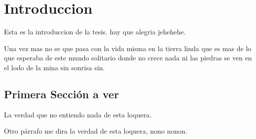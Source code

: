 \chapter{Introduccion}

Esta es la introduccion de la tesis. hay que alegria jehehehe.

Una vez mas no se que pasa con la vida misma en la tierra linda que es mas de lo que esperaba de este mundo solitario donde no crece nada ni las piedras se ven en el lodo de la mina sin sonrisa sin.

\section{Primera Sección a ver}

La verdad que no entiendo nada de esta loquera.

Otro párrafo me dira la verdad de esta loquera, nono nonon.